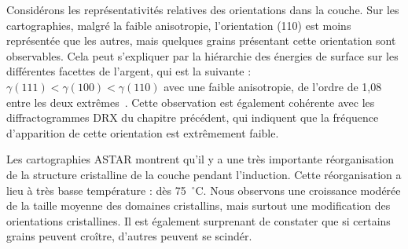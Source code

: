 Considérons les représentativités relatives des orientations dans la couche. Sur les cartographies, malgré la faible anisotropie, l’orientation (110) est moins représentée que les autres, mais quelques grains présentant cette orientation sont observables. Cela peut s’expliquer par la hiérarchie des énergies de surface sur les différentes facettes de l’argent, qui est la suivante : $\gamma(111) < \gamma(100) < \gamma(110)$ avec une faible anisotropie, de l’ordre de 1,08 entre les deux extrêmes~\cite{stankic2013equilibrium, molina2011size}. Cette observation est également cohérente avec les diffractogrammes DRX du chapitre précédent, qui indiquent que la fréquence d'apparition de cette orientation est extrêmement faible.\par 
Les cartographies ASTAR montrent qu’il y a une très importante réorganisation de la structure cristalline de la couche pendant l’induction. Cette réorganisation a lieu à très basse température : dès 75~$^\circ$C. Nous observons une croissance modérée de la taille moyenne des domaines cristallins, mais surtout une modification des orientations cristallines. Il est également surprenant de constater que si certains grains peuvent croître, d’autres peuvent se scindér.\par 
